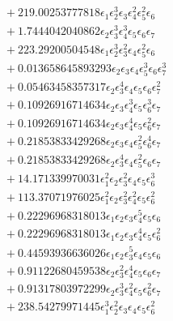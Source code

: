 \documentclass[10pt]{article}
\begin{document}
\begin{align*}
&{}  + 219.00253777818 \epsilon_{1} \epsilon_{2}^{3} \epsilon_{3} \epsilon_{4}^{2} \epsilon_{5}^{2} \epsilon_{6} \\
&{}  + 1.7444042040862 \epsilon_{2} \epsilon_{3}^{3} \epsilon_{4}^{3} \epsilon_{5} \epsilon_{6} \epsilon_{7} \\
&{}  + 223.29200504548 \epsilon_{1} \epsilon_{2}^{3} \epsilon_{3}^{2} \epsilon_{4} \epsilon_{5}^{2} \epsilon_{6} \\
&{}  + 0.013658645893293 \epsilon_{2} \epsilon_{3} \epsilon_{4} \epsilon_{5}^{3} \epsilon_{6} \epsilon_{7}^{3} \\
&{}  + 0.05463458357317 \epsilon_{2} \epsilon_{3}^{4} \epsilon_{4} \epsilon_{5} \epsilon_{6} \epsilon_{7}^{2} \\
&{}  + 0.10926916714634 \epsilon_{2} \epsilon_{3} \epsilon_{4}^{3} \epsilon_{5} \epsilon_{6}^{3} \epsilon_{7} \\
&{}  + 0.10926916714634 \epsilon_{2} \epsilon_{3} \epsilon_{4}^{4} \epsilon_{5} \epsilon_{6}^{2} \epsilon_{7} \\
&{}  + 0.21853833429268 \epsilon_{2} \epsilon_{3} \epsilon_{4} \epsilon_{5}^{2} \epsilon_{6}^{4} \epsilon_{7} \\
&{}  + 0.21853833429268 \epsilon_{2} \epsilon_{3}^{4} \epsilon_{4} \epsilon_{5}^{2} \epsilon_{6} \epsilon_{7} \\
&{}  + 14.171339970031 \epsilon_{1}^{2} \epsilon_{2} \epsilon_{3}^{2} \epsilon_{4} \epsilon_{5} \epsilon_{6}^{3} \\
&{}  + 113.37071976025 \epsilon_{1}^{2} \epsilon_{2} \epsilon_{3}^{2} \epsilon_{4}^{2} \epsilon_{5} \epsilon_{6}^{2} \\
&{}  + 0.22296968318013 \epsilon_{1} \epsilon_{2} \epsilon_{3} \epsilon_{4}^{5} \epsilon_{5} \epsilon_{6} \\
&{}  + 0.22296968318013 \epsilon_{1} \epsilon_{2} \epsilon_{3} \epsilon_{4}^{4} \epsilon_{5} \epsilon_{6}^{2} \\
&{}  + 0.44593936636026 \epsilon_{1} \epsilon_{2} \epsilon_{3}^{5} \epsilon_{4} \epsilon_{5} \epsilon_{6} \\
&{}  + 0.91122680459538 \epsilon_{2} \epsilon_{3}^{2} \epsilon_{4}^{4} \epsilon_{5} \epsilon_{6} \epsilon_{7} \\
&{}  + 0.91317803972299 \epsilon_{2} \epsilon_{3}^{3} \epsilon_{4}^{2} \epsilon_{5} \epsilon_{6}^{2} \epsilon_{7} \\
&{}  + 238.54279971445 \epsilon_{1}^{3} \epsilon_{2}^{2} \epsilon_{3} \epsilon_{4} \epsilon_{5} \epsilon_{6}^{2} \\

\end{align*}
\end{document}
